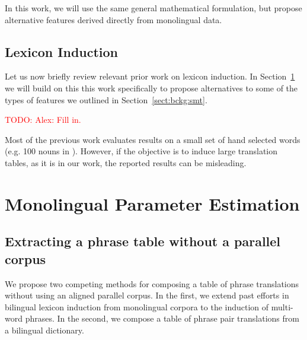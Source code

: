 \documentclass[11pt]{article}
\newcommand{\mnote}[1]{\marginpar{%
  \vskip-\baselineskip
  \raggedright\footnotesize
  \itshape\hrule\smallskip\tiny{#1}\par\smallskip\hrule}}
\newcommand{\mtodo}[1]{\mnote{\textcolor{red}{#1}}}
\newcommand{\todo}[1]{\textcolor{red}{TODO: #1}}
\newcommand{\secref}[1]{Section~\ref{#1}}
\begin{document}
In this work, we will use the same general mathematical formulation, but propose alternative features derived directly from monolingual data.

 \subsection{Lexicon Induction} \label{sect:bckg:lexind}
 
Let us now briefly review relevant prior work on lexicon induction.  In \secref{sect:mono} we will build on this this work specifically to propose alternatives to some of the types of features we outlined in \secref{sect:bckg:smt}.

\todo{Alex: Fill in.}

Most of the previous work evaluates results on a small set of hand selected words (e.g. 100 nouns in \cite{Rapp:1995}).  However, if the objective is to induce large translation tables, as it is in our work, the reported results can be misleading. \mtodo{Diss prev work, but make sure that it comes across that these features are informative.}
 

\section{Monolingual Parameter Estimation} \label{sect:mono}

\subsection{Extracting a phrase table without a parallel corpus}  \label{sect:extract}
We propose two competing methods for composing a table of phrase translations without using an aligned parallel corpus. In the first, we extend past efforts in bilingual lexicon induction from monolingual corpora to the induction of multi-word phrases. In the second, we compose a table of phrase pair translations from a bilingual dictionary.\\
\end{document}
